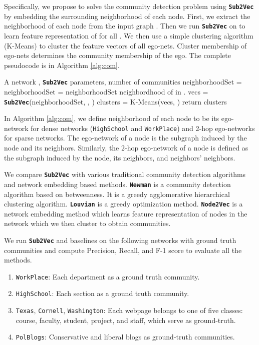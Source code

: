 \documentclass[sigconf]{acmart}
\newcommand{\alg}{{\bf {\tt Sub2Vec}}\xspace}
\newcommand{\nodevec}{{\bf {\tt Node2Vec}}\xspace}
\newcommand{\newman}{{\bf {\tt Newman}}\xspace}
\newcommand{\dlouvian}{{\bf {\tt Louvian}}\xspace}
\newcommand{\workplace}{{\tt WorkPlace}\xspace}
\newcommand{\highschool}{{\tt HighSchool}\xspace}
\newcommand{\polblogs}{{\tt PolBlogs}\xspace}
\newcommand{\texas}{{\tt Texas}\xspace}
\newcommand{\washington}{{\tt Washington}\xspace}
\newcommand{\cornell}{{\tt Cornell}\xspace}
\begin{document}
Specifically, we propose to solve the community detection problem using \alg by embedding the surrounding neighborhood of each node. First, we extract the neighborhood  of each node  from the input graph . Then we run \alg on  to learn feature representation of  for all . We then use a simple clustering algorithm (K-Means) to cluster the feature vectors  of all ego-nets. Cluster membership of ego-nets determines the community membership of the ego.   The complete pseudocode is in Algorithm \ref{alg:com}.
  

\begin{algorithm}
\caption{Community Detection using \alg}
\label{alg:com}
\begin{algorithmic} [1]
\REQUIRE A network , \alg parameters,  number of communities
\STATE neighborhoodSet =  
	\STATE neighborhoodSet = neighborhoodSet  neighbordhood of  in .
\ENDFOR
\STATE vecs = \alg(neighborhoodSet, , )
\STATE clusters = K-Means(vecs, )
\STATE return clusters
\end{algorithmic}
\end{algorithm}

In Algorithm \ref{alg:com},  we define neighborhood of each node to be its ego-network for dense networks (\highschool and \workplace) and 2-hop ego-networks for sparse networks. The ego-network of a node is the subgraph induced by the node and its neighbors.  Similarly,  the 2-hop ego-network of a node is defined as the subgraph induced by the node, its neighbors, and neighbors' neighbors. 

We compare \alg with various traditional community detection algorithms and network embedding based methods. \newman \cite{girvan2002community} is a community detection algorithm based on betweenness. It is a greedy agglomerative hierarchical clustering algorithm. \dlouvian \cite{blondel2008fast} is a greedy optimization method. \nodevec is a network embedding method which learns feature representation of nodes in the network which we then cluster to obtain communities. 


We run \alg and baselines on the following networks with ground truth communities and compute Precision, Recall, and F-1 score to evaluate all the methods. 

\begin{enumerate}[wide, labelwidth=!, labelindent=0pt, itemsep=0pt]
\item  \workplace: Each department as a ground truth community. 
 
 \item \highschool: Each section as a ground truth community. 

\item \texas, \cornell, \washington: Each webpage belongs to one of five classes: course, faculty, student, project, and staff, which serve as ground-truth.

\item \polblogs: Conservative and liberal blogs as ground-truth communities. 

\end{enumerate}
\end{document}
